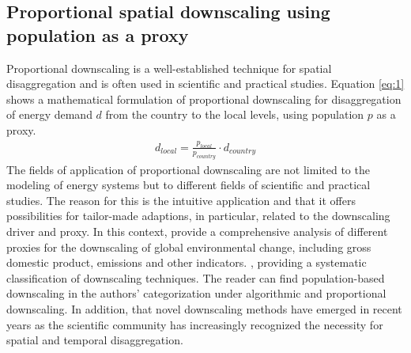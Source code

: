 \subsection{Proportional spatial downscaling using population as a proxy}\label{pop}
Proportional downscaling is a well-established technique for spatial disaggregation and is often used in scientific and practical studies. Equation \ref{eq:1} shows a mathematical formulation of proportional downscaling for disaggregation of energy demand $d$ from the country to the local levels, using population $p$ as a proxy.
\begin{align}\label{eq:1}
d_{local}=\frac{p_{local}}{p_{country}} \cdot d_{country}
\end{align}
The fields of application of proportional downscaling are not limited to the modeling of energy systems but to different fields of scientific and practical studies. The reason for this is the intuitive application and that it offers possibilities for tailor-made adaptions, in particular, related to the downscaling driver and proxy. In this context,  provide a comprehensive analysis of different proxies for the downscaling of global environmental change, including gross domestic product, emissions and other indicators.   \cite{van2010downscaling}, providing a systematic classification of  downscaling techniques. The reader can find population-based downscaling in the authors' categorization under algorithmic and proportional downscaling. In addition,  that novel downscaling methods have emerged in recent years as the scientific community has increasingly recognized the necessity for spatial and temporal disaggregation.

